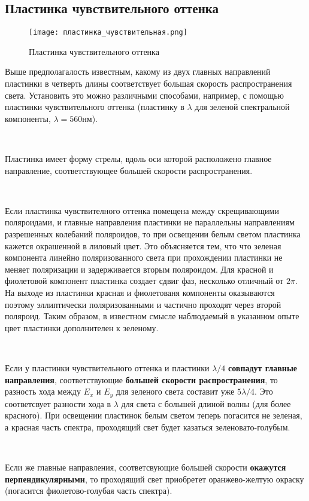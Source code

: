 \documentclass[12pt,a4paper]{article}
\begin{document}
\subsection{Пластинка чувствительного оттенка}


\begin{wrapfigure}[13]{r}{130pt}
	\texttt{[image: пластинка\_чувствительная.png]}
	\caption{Пластинка чувствительного оттенка}
	\label{p10}
	\end{wrapfigure}

Выше предполагалость известным, какому из двух главных направлений пластинки в четверть длины соответствует большая скорость распространения света. Установить  это можно различными способами, например, с помощью пластинки чувствительного оттенка (пластинку в $\lambda$ для зеленой спектральной компоненты, $\lambda = 560 нм$).

\

Пластинка имеет форму стрелы, вдоль оси которой расположено главное направление, соответствующее большей скорости распространения. 

\

Если пластинка чувствителного оттенка помещена между скрещивающими поляроидами, и главные направления пластинки не параллельны направлениям разрешенных колебаний поляроидов, то при освещении белым светом пластинка кажется окрашенной в лиловый цвет. Это объясняется тем, что что зеленая компонента линейно поляризованного света при прохождении пластинки не меняет поляризации и задерживается вторым поляроидом. Для красной и фиолетовой компонент пластинка создает сдвиг фаз, несколько отличный от $2\pi$. На выходе из пластинки  красная и фиолетованя компоненты оказываются поэтому эллиптически поляризованными и частично проходят через второй поляроид. Таким образом, в известном смысле наблюдаемый в указанном опыте цвет пластинки дополнителен к зеленому.

\


Если у пластинки чувствительного оттенка и пластинки $\lambda/4$ \textbf{совпадут главные направления}, соответствующие \textbf{большей скорости распространения}, то разность хода между $E_x$ и $E_y$ для зеленого света составит уже $5\lambda/4$. Это соответсвует разности хода в $\lambda$ для света с большей длиной волны (для более красного). При освещении пластинок белым светом теперь погасится не зеленая, а красная часть спектра, проходящий свет будет казаться зеленовато-голубым.

\

Если же главные направления, соответсвующие большей скорости \textbf{окажутся перпендикулярными}, то проходящий свет приобретет оранжево-желтую окраску (погасится фиолетово-голубая часть спектра). 
\end{document}

